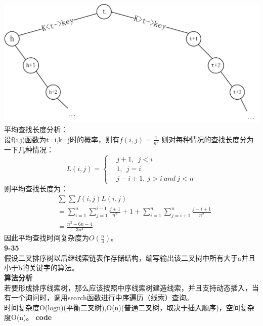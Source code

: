 \documentclass[UTF8,a4paper]{article}
\begin{document}
\includegraphics[scale=1]{9-29.png}\\
平均查找长度分析：\\
设f(i,j)函数为t=i,k=j时的概率，则有$f(i,j)=\frac{1}{n^2}$
则对每种情况的查找长度分为一下几种情况：
$$
L(i,j)=
\left\{
    \begin{aligned}
        &j+1,~~j<i\\
        &1,~~j=i\\
        &j-i+1,~j>i~and~j<n
    \end{aligned}
\right.
$$
则平均查找长度为：
$$
\begin{aligned}
&\sum \sum f(i,j)L(i,j)\\
&=\sum_{i=1}^{n} \sum_{j=1}^{i-1} \frac{j+1}{n^2}+1+\sum_{i=1}^{n} \sum_{j=i+1}^{n} \frac{j-i+1}{n^2}\\
&=\frac{n^3+6n-4}{3n^2}
\end{aligned}
$$
因此平均查找时间复杂度为$O(\frac{n}{3})$。\\[1cm]
\textbf{9-35}\\
假设二叉排序树以后继线索链表作存储结构，编写输出该二叉树中所有大于a并且小于b的关键字的算法。\\
\textbf{算法分析}\\
若要形成排序线索树，那么应该按照中序线索树建造线索，并且支持动态插入，当有一个询问时，调用search函数进行中序遍历（线索）查询。\\
时间复杂度O(logn)(平衡二叉树),O(n)(普通二叉树，取决于插入顺序)，空间复杂度O(n)。
\textbf{code}
\end{document}
